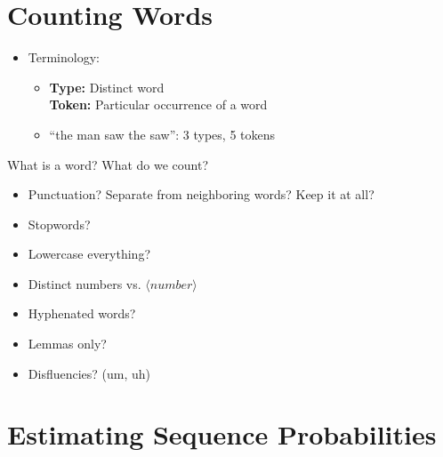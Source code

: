 \documentclass[11pt,letterpaper]{article}
\begin{document}
\section{Counting Words}

\begin{itemize}
  \item Terminology:
    \begin{itemize}
      \item \textbf{Type:} Distinct word \\
            \textbf{Token:} Particular occurrence of a word
      \item ``the man saw the saw'': 3 types, 5 tokens
    \end{itemize}
\end{itemize}

What is a word?  What do we count?

\begin{itemize}
  \item Punctuation?  Separate from neighboring words?  Keep it at all?
  \item Stopwords?
  \item Lowercase everything?
  \item Distinct numbers vs. $\langle number \rangle$
  \item Hyphenated words?
  \item Lemmas only?
  \item Disfluencies?  (um, uh)
\end{itemize}





\section{Estimating Sequence Probabilities}
\end{document}
